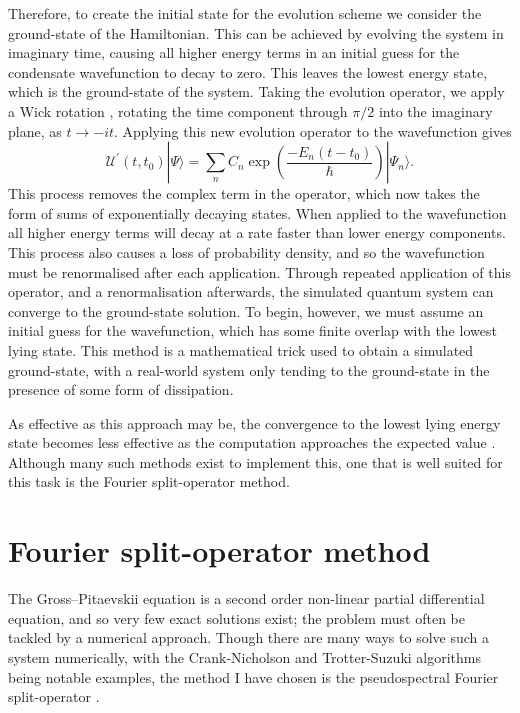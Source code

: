 Therefore, to create the initial state for the evolution scheme we consider the ground-state of the Hamiltonian. This can be achieved by evolving the system in imaginary time, causing all higher energy terms in an initial guess for the condensate wavefunction to decay to zero. This leaves the lowest energy state, which is the ground-state of the system. Taking the evolution operator, we apply a Wick rotation \cite{}, rotating the time component through $\pi/2$ into the imaginary plane, as $t \rightarrow -it$. Applying this new evolution operator to the wavefunction gives
\begin{equation}
       \mathscr{U^{'}}(t,t_0)|\Psi \rangle = \displaystyle\sum\limits_{n} C_n \exp\left(\frac{-{E_n}(t-t_0)}{\hbar}\right)|\Psi_n \rangle.
\end{equation}
This process removes the complex term in the operator, which now takes the form of sums of exponentially decaying states. When applied to the wavefunction all higher energy terms will decay at a rate faster than lower energy components. This process also causes a loss of probability density, and so the wavefunction must be renormalised after each application. Through repeated application of this operator, and a renormalisation afterwards, the simulated quantum system can converge to the ground-state solution. To begin, however, we must assume an initial guess for the wavefunction, which has some finite overlap with the lowest lying state. This method is a mathematical trick used to obtain a simulated ground-state, with a real-world system only tending to the ground-state in the presence of some form of dissipation.

As effective as this approach may be, the convergence to the lowest lying energy state becomes less effective as the computation approaches the expected value \cite{Vtx:Danaila_pra_2005}. Although many such methods exist to implement this, one that is well suited for this task is the Fourier split-operator method.

\section{Fourier split-operator method}\label{sec:numerics}
The Gross--Pitaevskii equation is a second order non-linear partial differential equation, and so very few exact solutions exist; the problem must often be tackled by a numerical approach. Though there are many ways to solve such a system numerically, with the Crank-Nicholson and Trotter-Suzuki algorithms being notable examples, the method I have chosen is the pseudospectral Fourier split-operator \cite{Num:Bauke_cpc_2011}.

